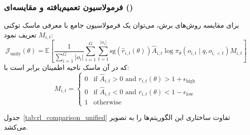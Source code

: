 \subsubsection*{فرمولاسیون تعمیم‌یافته و مقایسه‌ای ()}

برای مقایسه روش‌های برش، می‌توان یک فرمولاسیون جامع با معرفی ماسک توکنی $M_{i,t}$ تعریف نمود:
\begin{equation}
	\mathcal{J}_{\text{unify}}(\theta) = \mathbb{E} \left[ \frac{1}{\sum_{i=1}^G |o_i|} \sum_{i=1}^G \sum_{t=1}^{|o_i|} \text{sg}\left(\hat{r}_{i,t}(\theta)\right) \hat{A}_{i,t} \log \pi_\theta(o_{i,t} \mid q, o_{i,<t}) M_{i,t} \right]
\end{equation}
که در آن ماسک ناحیه اطمینان برابر است با:
\begin{equation}
	M_{i,t} = \begin{cases} 
		0 & \text{if } \hat{A}_{i,t} > 0 \text{ and } r_{i,t}(\theta) > 1 + \epsilon_{\text{high}} \\
		0 & \text{if } \hat{A}_{i,t} < 0 \text{ and } r_{i,t}(\theta) < 1 - \epsilon_{\text{low}} \\
		1 & \text{otherwise}
	\end{cases}
\end{equation}

جدول~\ref{tab:rl_comparison_unified} تفاوت ساختاری این الگوریتم‌ها را به تصویر می‌کشد.

\begin{table}[htbp]
\centering
\caption{مقایسه ساختاری الگوریتم‌های یادگیری تقویتی برون‌پویا بر پایه فرمولاسیون یکپارچه.}
\label{tab:rl_comparison_unified}
\end{table}


